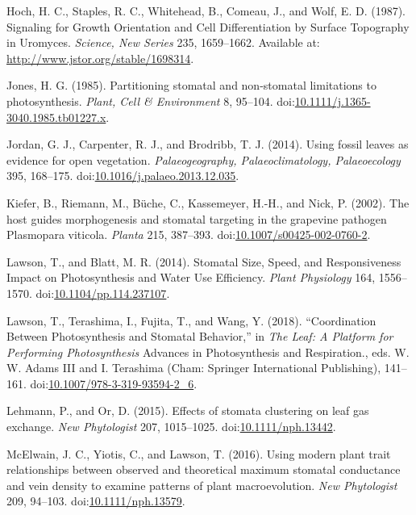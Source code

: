 \documentclass[utf8]{frontiersSCNS}
\begin{document}
\leavevmode\hypertarget{ref-hoch_signaling_1987}{}%
Hoch, H. C., Staples, R. C., Whitehead, B., Comeau, J., and Wolf, E. D.
(1987). Signaling for Growth Orientation and Cell Differentiation by
Surface Topography in Uromyces. \emph{Science, New Series} 235,
1659--1662. Available at: \url{http://www.jstor.org/stable/1698314}.

\leavevmode\hypertarget{ref-jones_partitioning_1985}{}%
Jones, H. G. (1985). Partitioning stomatal and non-stomatal limitations
to photosynthesis. \emph{Plant, Cell \& Environment} 8, 95--104.
doi:\href{https://doi.org/10.1111/j.1365-3040.1985.tb01227.x}{10.1111/j.1365-3040.1985.tb01227.x}.

\leavevmode\hypertarget{ref-jordan_using_2014}{}%
Jordan, G. J., Carpenter, R. J., and Brodribb, T. J. (2014). Using
fossil leaves as evidence for open vegetation. \emph{Palaeogeography,
Palaeoclimatology, Palaeoecology} 395, 168--175.
doi:\href{https://doi.org/10.1016/j.palaeo.2013.12.035}{10.1016/j.palaeo.2013.12.035}.

\leavevmode\hypertarget{ref-kiefer_host_2002}{}%
Kiefer, B., Riemann, M., Büche, C., Kassemeyer, H.-H., and Nick, P.
(2002). The host guides morphogenesis and stomatal targeting in the
grapevine pathogen Plasmopara viticola. \emph{Planta} 215, 387--393.
doi:\href{https://doi.org/10.1007/s00425-002-0760-2}{10.1007/s00425-002-0760-2}.

\leavevmode\hypertarget{ref-lawson_stomatal_2014}{}%
Lawson, T., and Blatt, M. R. (2014). Stomatal Size, Speed, and
Responsiveness Impact on Photosynthesis and Water Use Efficiency.
\emph{Plant Physiology} 164, 1556--1570.
doi:\href{https://doi.org/10.1104/pp.114.237107}{10.1104/pp.114.237107}.

\leavevmode\hypertarget{ref-lawson_coordination_2018}{}%
Lawson, T., Terashima, I., Fujita, T., and Wang, Y. (2018).
``Coordination Between Photosynthesis and Stomatal Behavior,'' in
\emph{The Leaf: A Platform for Performing Photosynthesis} Advances in
Photosynthesis and Respiration., eds. W. W. Adams III and I. Terashima
(Cham: Springer International Publishing), 141--161.
doi:\href{https://doi.org/10.1007/978-3-319-93594-2_6}{10.1007/978-3-319-93594-2\_6}.

\leavevmode\hypertarget{ref-lehmann_effects_2015}{}%
Lehmann, P., and Or, D. (2015). Effects of stomata clustering on leaf
gas exchange. \emph{New Phytologist} 207, 1015--1025.
doi:\href{https://doi.org/10.1111/nph.13442}{10.1111/nph.13442}.

\leavevmode\hypertarget{ref-mcelwain_using_2016}{}%
McElwain, J. C., Yiotis, C., and Lawson, T. (2016). Using modern plant
trait relationships between observed and theoretical maximum stomatal
conductance and vein density to examine patterns of plant
macroevolution. \emph{New Phytologist} 209, 94--103.
doi:\href{https://doi.org/10.1111/nph.13579}{10.1111/nph.13579}.
\end{document}
